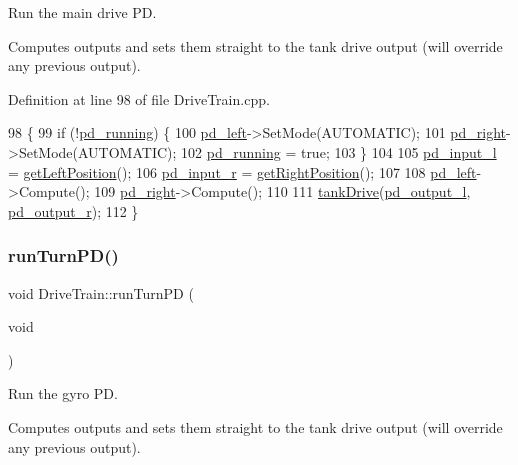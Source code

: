 Run the main drive PD. 

Computes outputs and sets them straight to the tank drive output (will override any previous output). 

Definition at line 98 of file Drive\+Train.\+cpp.


\begin{DoxyCode}
98                            \{
99     \textcolor{keywordflow}{if} (!\hyperlink{class_drive_train_a24c0d92ca340c9afda1544f6ab67ea11}{pd\_running}) \{
100         \hyperlink{class_drive_train_a89603458433a6b9beffc91e6fa73f32d}{pd\_left}->SetMode(AUTOMATIC);
101         \hyperlink{class_drive_train_ab132e86e29dbc4e7d5613786658719f0}{pd\_right}->SetMode(AUTOMATIC);
102         \hyperlink{class_drive_train_a24c0d92ca340c9afda1544f6ab67ea11}{pd\_running} = \textcolor{keyword}{true};
103     \}
104 
105     \hyperlink{class_drive_train_a5fbf7b883990fe8bf69f6a81c317438f}{pd\_input\_l} = \hyperlink{class_drive_train_a9ec0f8309cf9670fec618e8b00f70390}{getLeftPosition}();
106     \hyperlink{class_drive_train_a663ad534480bcd9ca2010a23dc506997}{pd\_input\_r} = \hyperlink{class_drive_train_aa52a34fcdfad88883c78b81336661137}{getRightPosition}();
107 
108     \hyperlink{class_drive_train_a89603458433a6b9beffc91e6fa73f32d}{pd\_left}->Compute();
109     \hyperlink{class_drive_train_ab132e86e29dbc4e7d5613786658719f0}{pd\_right}->Compute();
110 
111     \hyperlink{class_drive_train_a60ef155b4f149532a2ae872edc0e2cc2}{tankDrive}(\hyperlink{class_drive_train_a53268d36c28c3ed0e70aaf69086d4953}{pd\_output\_l}, \hyperlink{class_drive_train_a4c3242a549d04b72192e5cf9e590845e}{pd\_output\_r});
112 \}
\end{DoxyCode}
\mbox{\label{class_drive_train_abbd159972d9f4dd6fa0dd0f398a498dc}} 
\subsubsection{\texorpdfstring{run\+Turn\+P\+D()}{runTurnPD()}}
{\footnotesize\ttfamily void Drive\+Train\+::run\+Turn\+PD (\begin{DoxyParamCaption}\item[{void}]{ }\end{DoxyParamCaption})}



Run the gyro PD. 

Computes outputs and sets them straight to the tank drive output (will override any previous output). 

